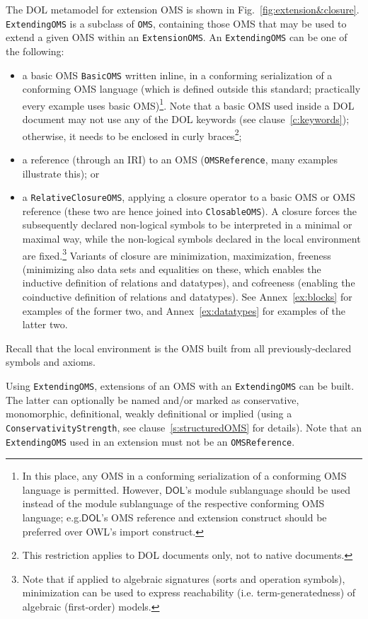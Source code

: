 \documentclass[10pt, a4paper]{isov2}
\makeatletter
\newcommand*{\eg}{e.g.\@\xspace}
\newcommand*{\syntax}[1]{\texttt{#1}}
\newcommand*{\DOL}{\ensuremath{\mathsf{DOL}}\xspace}
\makeatother
\begin{document}
The DOL metamodel for extension OMS is shown in Fig.~\ref{fig:extension&closure}.
\syntax{ExtendingOMS} is a subclass of \syntax{OMS}, containing
those OMS that may be used to extend a given OMS within an \syntax{ExtensionOMS}.
An \syntax{ExtendingOMS} can be one of the following:
\begin{itemize}
\item a basic OMS \syntax{BasicOMS} written inline, in a conforming serialization of a conforming OMS 
language (which is defined outside this standard; practically every example uses basic OMS)\footnote{In this place, any OMS in a conforming serialization of a conforming OMS language is permitted.  
However, \DOL's module sublanguage should be used instead of the module sublanguage of 
the respective conforming OMS language; \eg \DOL's OMS reference and extension construct should be preferred over OWL's import construct.}.
Note that a basic OMS used inside a DOL document may not use any of the DOL
keywords (see clause~\ref{c:keywords}); otherwise, it needs to be enclosed in curly braces\footnote{This restriction applies to DOL documents only,
 not to native documents.};
\item a reference (through an IRI) to an OMS (\syntax{OMSReference}, many examples illustrate this); or
\item a \syntax{RelativeClosureOMS}, applying a closure operator to a
  basic OMS or OMS reference (these two are hence joined into
  \syntax{ClosableOMS}). A closure forces the subsequently declared
  non-logical symbols to be interpreted in a minimal  or
  maximal way, while the non-logical symbols declared  in
  the local environment are fixed.\footnote
  {Note that if applied to algebraic signatures (sorts and operation symbols),
    minimization can be used to express reachability (i.e. term-generatedness)
    of algebraic (first-order) models.}
  Variants of closure are
  minimization, maximization, freeness (minimizing also data
  sets and equalities on these,  which enables the inductive
  definition of relations and datatypes), and cofreeness (enabling the
  coinductive definition of relations and datatypes).
  See Annex~\ref{ex:blocks} for examples of the former two, and
  Annex~\ref{ex:datatypes} for examples of the latter two.
\end{itemize}
Recall that the local environment is the OMS built from all
previously-declared symbols and axioms.

Using \syntax{ExtendingOMS}, extensions of an OMS with an \syntax{ExtendingOMS}
can be built. The latter can optionally be named and/or marked as conservative, monomorphic, definitional, weakly definitional or implied (using a \syntax{ConservativityStrength}, see clause~\ref{s:structuredOMS} for details).
Note that an \syntax{ExtendingOMS} used in an extension must
not be an \syntax{OMSReference}.
\end{document}
